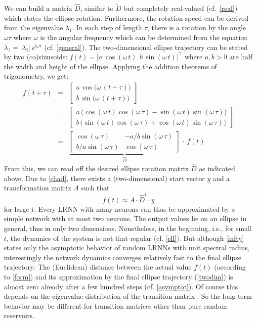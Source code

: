 \documentclass[preprint,12pt,times,authoryear]{elsarticle}%
\theoremstyle{definition}
\begin{document}
We can build a matrix $\hat{D}$, similar to $\tilde{D}$ but completely real-valued
(cf.~\cref{real}) which states the ellipse rotation. Furthermore, the rotation
speed can be derived from the eigenvalue $\lambda_1$. In each step of length
$\tau$, there is a rotation by the angle $\omega\tau$ where $\omega$ is the
angular frequency which can be determined from the equation $\lambda_1 =
|\lambda_1|\,e^{\mathfrak{i}\omega\tau}$ (cf. \cref{general}). The two-dimensional ellipse trajectory
can be stated by two (co)sinusoids: $f(t) = \big[ a\,\cos(\omega\,t) ~~
b\,\sin(\omega\,t) \big]^\top$ where $a,b > 0$ are half the width and height of
the ellipse. Applying the addition theorems of trigonometry, we get:
\begin{eqnarray*}
	f(t+\tau) & = &
	\left[ \begin{array}{c} a\,\cos\!\big(\omega\,(t+\tau)\big) \\ b\,\sin\!\big(\omega\,(t+\tau)\big) \end{array} \right]\\ & = &
	\left[ \begin{array}{c}
		a\,\big(\!\cos(\omega\,t) \cos(\omega\,\tau) - \sin(\omega\,t) \sin(\omega\,\tau) \big) \\
		b\,\big(\!\sin(\omega\,t) \cos(\omega\,\tau) + \cos(\omega\,t) \sin(\omega\,\tau) \big)
	\end{array} \right] \\ & = &
	\underbrace{\left[ \begin{array}{cc}
		\cos(\omega\,\tau) & -a/b \sin(\omega\,\tau) \\
		b/a \sin(\omega\,\tau) & \cos(\omega\,\tau)
	\end{array} \right]}_{\displaystyle\hat{D}}\,\cdot\,f(t)
\end{eqnarray*}
From this, we can read off the desired ellipse rotation matrix $\hat{D}$ as
indicated above. Due to \cref{chad}, there exists a (two-dimensional) start
vector $y$ and a transformation matrix $A$ such that
\begin{equation}\label{twodim}
	f(t) \approx A \cdot \hat{D}^t \cdot y
\end{equation}
for large $t$. Every LRNN with many neurons can thus be approximated by a simple
network with at most two neurons. The output values lie on an ellipse in
general, thus in only two dimensions. Nonetheless, in the beginning, i.e., for
small $t$, the dynamics of the system is not that regular (cf. \cref{ell}). But
although \cref{infty} states only the asymptotic behavior of random LRNNs with
unit spectral radius, interestingly the network dynamics converges relatively
fast to the final ellipse trajectory: The (Euclidean) distance between the
actual value $f(t)$ (according to \cref{form}) and its approximation by the
final ellipse trajectory (\cref{twodim}) is almost zero already after a few
hundred steps (cf. \cref{asymptot}). Of course this depends on the eigenvalue
distribution of the transition matrix \citep{TV10}. So the long-term behavior
may be different for transition matrices other than pure random reservoirs.
\end{document}
